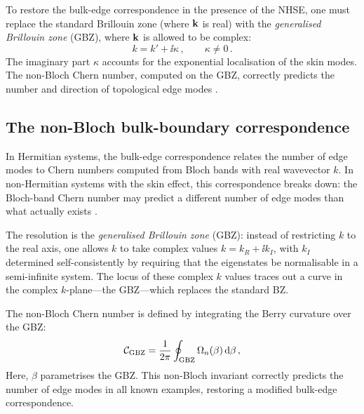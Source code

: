 To restore the bulk-edge correspondence in the presence of the NHSE,
one must replace the standard Brillouin zone (where $\mathbf{k}$ is real)
with the \emph{generalised Brillouin zone} (GBZ), where $\mathbf{k}$ is
allowed to be complex:
\begin{equation}\label{eq:ch17-gbz}
  k = k' + \ii\kappa\,,\qquad \kappa\neq 0\,.
\end{equation}
The imaginary part $\kappa$ accounts for the exponential localisation
of the skin modes.  The non-Bloch Chern number, computed on the GBZ,
correctly predicts the number and direction of topological edge modes
\cite{kunst2018biorthogonal}.

\subsection{The non-Bloch bulk-boundary correspondence}
\label{sec:ch17-non-bloch}

In Hermitian systems, the bulk-edge correspondence relates the number
of edge modes to Chern numbers computed from Bloch bands with real
wavevector $k$.  In non-Hermitian systems with the skin effect, this
correspondence breaks down: the Bloch-band Chern number may predict a
different number of edge modes than what actually exists
\cite{lee2016anomalous,gong2018topologicala}.

The resolution is the \emph{generalised Brillouin zone} (GBZ): instead
of restricting $k$ to the real axis, one allows $k$ to take complex
values $k=k_R+\ii k_I$, with $k_I$ determined self-consistently by
requiring that the eigenstates be normalisable in a semi-infinite
system.  The locus of these complex $k$ values traces out a curve in
the complex $k$-plane---the GBZ---which replaces the standard BZ.

The non-Bloch Chern number is defined by integrating the Berry
curvature over the GBZ:
\begin{equation}\label{eq:ch17-non-bloch-chern}
  \mathcal{C}_{\mathrm{GBZ}}
  = \frac{1}{2\pi}\oint_{\mathrm{GBZ}}
  \Omega_n(\beta)\,\mathrm{d}\beta\,,
\end{equation}
Here, $\beta$ parametrises the GBZ.  This non-Bloch invariant
correctly predicts the number of edge modes in all known examples,
restoring a modified bulk-edge correspondence.


